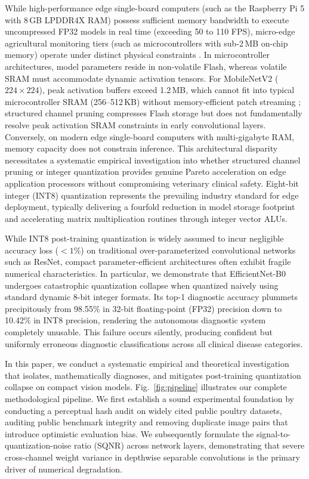 \documentclass{jcse}
\begin{document}
While high-performance edge single-board computers (such as the Raspberry Pi 5 with 8\,GB LPDDR4X RAM) possess sufficient memory bandwidth to execute uncompressed FP32 models in real time (exceeding 50 to 110 FPS), micro-edge agricultural monitoring tiers (such as microcontrollers with sub-2\,MB on-chip memory) operate under distinct physical constraints \cite{jacob2018quantization,wu2019tinyml}. In microcontroller architectures, model parameters reside in non-volatile Flash, whereas volatile SRAM must accommodate dynamic activation tensors. For MobileNetV2 ($224 \times 224$), peak activation buffers exceed 1.2\,MB, which cannot fit into typical microcontroller SRAM (256--512\,KB) without memory-efficient patch streaming \cite{lin2022mcunetv2}; structured channel pruning compresses Flash storage but does not fundamentally resolve peak activation SRAM constraints in early convolutional layers. Conversely, on modern edge single-board computers with multi-gigabyte RAM, memory capacity does not constrain inference. This architectural disparity necessitates a systematic empirical investigation into whether structured channel pruning or integer quantization provides genuine Pareto acceleration on edge application processors without compromising veterinary clinical safety. Eight-bit integer (INT8) quantization represents the prevailing industry standard for edge deployment, typically delivering a fourfold reduction in model storage footprint and accelerating matrix multiplication routines through integer vector ALUs.

While INT8 post-training quantization is widely assumed to incur negligible accuracy loss ($< 1\%$) on traditional over-parameterized convolutional networks such as ResNet, compact parameter-efficient architectures often exhibit fragile numerical characteristics. In particular, we demonstrate that EfficientNet-B0 \cite{tan2019efficientnet} undergoes catastrophic quantization collapse when quantized naively using standard dynamic 8-bit integer formats. Its top-1 diagnostic accuracy plummets precipitously from 98.55\% in 32-bit floating-point (FP32) precision down to 10.42\% in INT8 precision, rendering the autonomous diagnostic system completely unusable. This failure occurs silently, producing confident but uniformly erroneous diagnostic classifications across all clinical disease categories.

In this paper, we conduct a systematic empirical and theoretical investigation that isolates, mathematically diagnoses, and mitigates post-training quantization collapse on compact vision models. Fig.~\ref{fig:pipeline} illustrates our complete methodological pipeline. We first establish a sound experimental foundation by conducting a perceptual hash audit on widely cited public poultry datasets, auditing public benchmark integrity and removing duplicate image pairs that introduce optimistic evaluation bias. We subsequently formulate the signal-to-quantization-noise ratio (SQNR) across network layers, demonstrating that severe cross-channel weight variance in depthwise separable convolutions is the primary driver of numerical degradation. 
\end{document}
